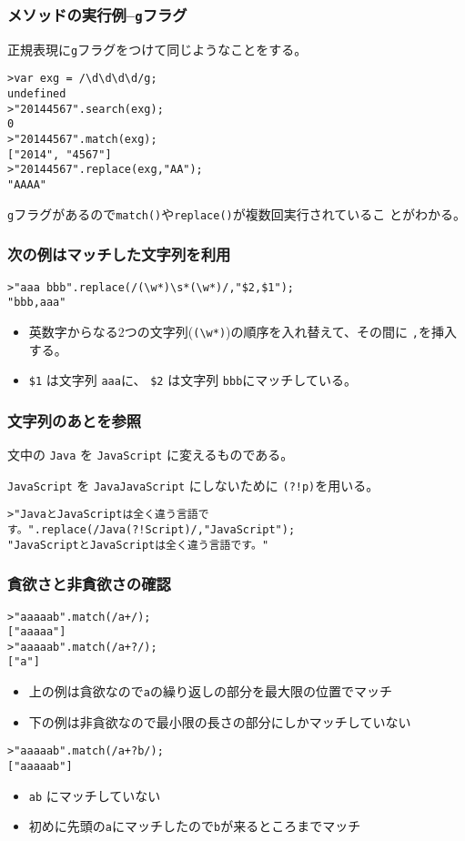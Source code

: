 \documentclass[dvipsk]{beamer}
\begin{document}
\begin{frame}[containsverbatim]
 \frametitle{メソッドの実行例--\protect\texttt{g}フラグ}
正規表現に\verb+g+フラグをつけて同じようなことをする。
\begin{verbatim}
>var exg = /\d\d\d\d/g;
undefined
>"20144567".search(exg);
0
>"20144567".match(exg);
["2014", "4567"]
>"20144567".replace(exg,"AA");
"AAAA"
\end{verbatim}
\verb+g+フラグがあるので\verb+match()+や\verb+replace()+が複数回実行されているこ
 とがわかる。
\end{frame}
\begin{frame}[containsverbatim]
 \frametitle{次の例はマッチした文字列を利用}
\begin{verbatim}
>"aaa bbb".replace(/(\w*)\s*(\w*)/,"$2,$1");
"bbb,aaa"
\end{verbatim}
\begin{itemize}
 \item 英数字からなる2つの文字列(\verb+(\w*)+)の順序を入れ替えて、その間に
 \verb+,+を挿入する。
 \item \verb+$1+ は文字列 \verb+aaa+に、
\verb+$2+ は文字列 \verb+bbb+にマッチしている。
\end{itemize}
\end{frame}
\begin{frame}[containsverbatim]
 \frametitle{文字列のあとを参照}
文中の \verb+Java+ を \verb+JavaScript+ に変えるものである。

\verb+JavaScript+ を \verb+JavaJavaScript+ にしないために
\verb+(?!p)+を用いる。
\begin{verbatim}
>"JavaとJavaScriptは全く違う言語です。".replace(/Java(?!Script)/,"JavaScript");
"JavaScriptとJavaScriptは全く違う言語です。"
\end{verbatim}
\end{frame}
\begin{frame}[containsverbatim]
 \frametitle{貪欲さと非貪欲さの確認}
\begin{verbatim}
>"aaaaab".match(/a+/);
["aaaaa"]
>"aaaaab".match(/a+?/);
["a"]
\end{verbatim}
\begin{itemize}
 \item 上の例は貪欲なので\verb+a+の繰り返しの部分を最大限の位置でマッチ
 \item 下の例は非貪欲なので最小限の長さの部分にしかマッチしていない
\end{itemize}
\begin{verbatim}
>"aaaaab".match(/a+?b/);
["aaaaab"]
\end{verbatim}
\begin{itemize}
 \item \verb+ab+ にマッチしていない
 \item 初めに先頭の\verb+a+にマッチしたので\verb+b+が来るところまでマッチ
\end{itemize}

\end{frame}
\end{document}
